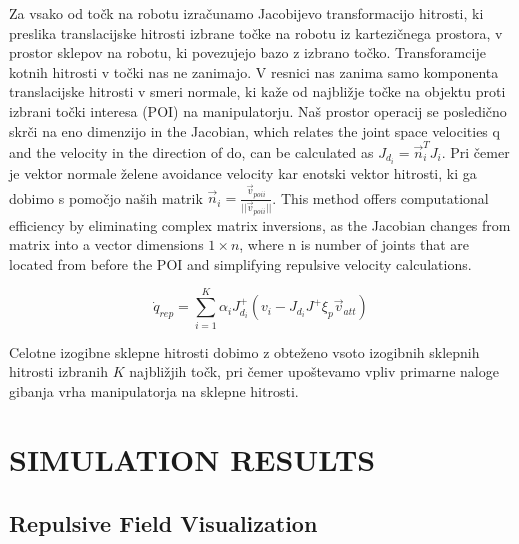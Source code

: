 \documentclass[letterpaper, 10 pt, conference]{ieeeconf}  %
\begin{document}
Za vsako od točk na robotu izračunamo Jacobijevo transformacijo hitrosti, ki preslika translacijske hitrosti izbrane točke na robotu iz kartezičnega prostora, v prostor sklepov na robotu, ki povezujejo bazo z izbrano točko. Transforamcije kotnih hitrosti v točki nas ne zanimajo. V resnici nas zanima samo komponenta translacijske hitrosti v smeri normale, ki kaže od najbližje točke na objektu proti izbrani točki interesa (POI) na manipulatorju. Naš prostor operacij se posledično skrči na eno dimenzijo in the Jacobian, which relates the joint space velocities q and the velocity in the direction of do, can be calculated as  $J_{d_i} = \vec{n}_i^T J_i$.   Pri čemer je vektor normale želene avoidance velocity kar enotski vektor hitrosti, ki ga dobimo s pomočjo naših matrik $\vec{n}_{i} = \frac{\vec{v}_{poi i}}{||\vec{v}_{poi i}||}$. This method offers computational efficiency by eliminating complex matrix inversions, as the Jacobian changes from matrix into a vector dimensions $1 \times n$, where n is number of joints that are located from before the POI and simplifying repulsive velocity calculations.

\begin{equation}
	\dot{q}_{rep} = \sum_{i=1}^{K} \alpha_i J_{d_i}^{+} \left(v_i - J_{d_i} J^{+} \xi_{p} \vec{v}_{att}\right)
\end{equation}

Celotne izogibne sklepne hitrosti dobimo z obteženo vsoto izogibnih sklepnih hitrosti izbranih $K$ najbližjih točk, pri čemer upoštevamo vpliv primarne naloge gibanja vrha manipulatorja na sklepne hitrosti.







\section{SIMULATION RESULTS}


\subsection{Repulsive Field Visualization}
\end{document}
